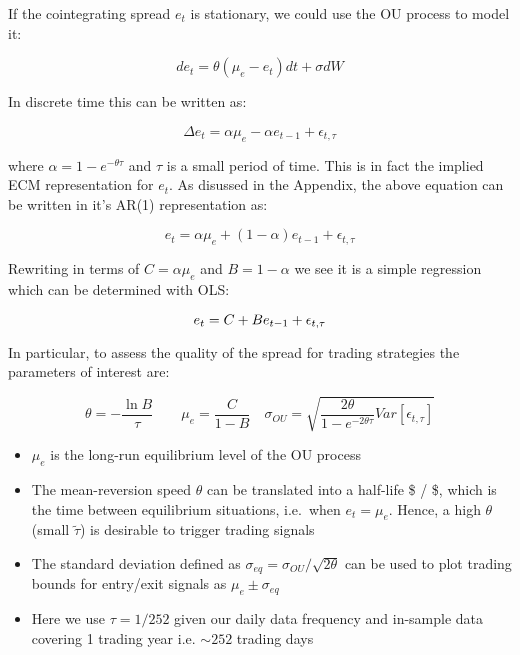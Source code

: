 \documentclass{article}
\begin{document}
If the cointegrating spread \(e_t\) is stationary, we could use the OU
process to model it:

\[
d e_t = \theta (\mu_e - e_t) dt + \sigma dW
\]

In discrete time this can be written as:

\[ 
\begin{equation}
\Delta e_t = \alpha \mu_e - \alpha e_{t-1} + \epsilon_{t, \tau}
\end{equation}
\]

where \(\alpha= 1 - e^{-\theta \tau}\) and \(\tau\) is a small period of
time. This is in fact the implied ECM representation for \(e_t\). As
disussed in the Appendix, the above equation can be written in it's
AR(1) representation as:

\[
e_t = \alpha \mu_e + (1-\alpha)e_{t-1} + \epsilon_{t, \tau}
\]

Rewriting in terms of \(C = \alpha \mu_e\) and \(B=1-\alpha\) we see it
is a simple regression which can be determined with OLS:

\[ 
\begin{equation}
e_t = C + B e_{t-1} + \epsilon_{t, \tau} \\
\end{equation}
\]

In particular, to assess the quality of the spread for trading
strategies the parameters of interest are:

\[
\theta = -\frac{\ln B}{\tau} \qquad \mu_e = \frac{C}{1-B} 
\quad \sigma_{OU} = \sqrt{\frac{2 \theta}{1-e^{-2\theta \tau}} Var[\epsilon_{t, \tau}]}
\]

\begin{itemize}
\item
  \(\mu_e\) is the long-run equilibrium level of the OU process
\item
  The mean-reversion speed \(\theta\) can be translated into a half-life
  \$\tilde{\tau} \propto {} / \theta \$, which is the time between
  equilibrium situations, i.e.~when \(e_t = \mu_e\). Hence, a high
  \(\theta\) (small \(\tilde{\tau}\)) is desirable to trigger trading
  signals
\item
  The standard deviation defined as
  \(\sigma_{eq} = \sigma_{OU} / \sqrt{2 \theta}\) can be used to plot
  trading bounds for entry/exit signals as \(\mu_e \pm \sigma_{eq}\)
\item
  Here we use \(\tau = 1/252\) given our daily data frequency and
  in-sample data covering 1 trading year i.e. \(\sim 252\) trading days
\end{itemize}
\end{document}
